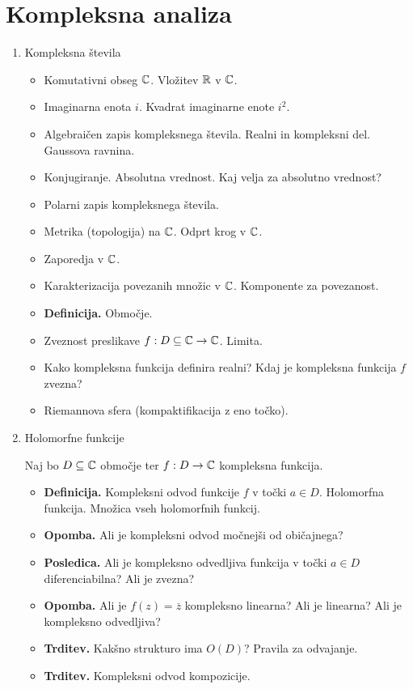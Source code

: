 \section{Kompleksna analiza}

\begin{enumerate}
    \item Kompleksna števila    
    \begin{itemize}
        \item Komutativni obseg \(\mathbb{C}\). Vložitev \(\mathbb{R}\) v \(\mathbb{C}\).
        \item Imaginarna enota \(i\). Kvadrat imaginarne enote \(i^2\).
        \item Algebraičen zapis kompleksnega števila. Realni in kompleksni del. Gaussova ravnina.
        \item Konjugiranje. Absolutna vrednost. Kaj velja za absolutno vrednost?
        \item Polarni zapis kompleksnega števila.
        \item Metrika (topologija) na \(\mathbb{C}\). Odprt krog v \(\mathbb{C}\).
        \item Zaporedja v \(\mathbb{C}\).
        \item Karakterizacija povezanih množic v \(\mathbb{C}\). Komponente za povezanost.
        \item \textbf{Definicija.} Območje.
        \item Zveznost preslikave \(f: D \subseteq \mathbb{C} \to \mathbb{C}\). Limita.
        \item Kako kompleksna funkcija definira realni? Kdaj je kompleksna funkcija \(f\) zvezna?
        \item Riemannova sfera (kompaktifikacija z eno točko).
    \end{itemize}

    \item Holomorfne funkcije
    
    Naj bo \(D \subseteq \mathbb{C}\) območje ter \(f: D \to \mathbb{C}\) kompleksna funkcija.
    \begin{itemize}
        \item \textbf{Definicija.} Kompleksni odvod funkcije \(f\) v točki \(a \in D\). Holomorfna funkcija. Množica vseh holomorfnih funkcij.
        \item \textbf{Opomba.} Ali je kompleksni odvod močnejši od običajnega?
        \item \textbf{Posledica.} Ali je kompleksno odvedljiva funkcija v točki \(a \in D\) diferenciabilna? Ali je zvezna?
        \item \textbf{Opomba.} Ali je \(f(z) = \overline{z}\) kompleksno linearna? Ali je linearna? Ali je kompleksno odvedljiva?
        \item \textbf{Trditev.} Kakšno strukturo ima \(O(D)\)? Pravila za odvajanje.
        \item \textbf{Trditev.} Kompleksni odvod kompozicije.
    \end{itemize}


\end{enumerate}
